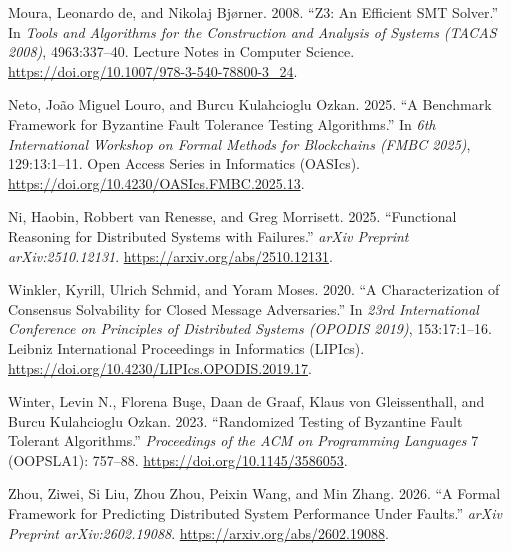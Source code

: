 \documentclass[10pt,a4paper]{article}
\newlength{\cslhangindent}
\newenvironment{CSLReferences}[2]
 {\begin{list}{}{%
  \setlength{\itemindent}{0pt}
  \setlength{\leftmargin}{0pt}
  \setlength{\parsep}{0pt}
  \ifodd #1
   \setlength{\leftmargin}{\cslhangindent}
   \setlength{\itemindent}{-1\cslhangindent}
  \fi
  \setlength{\itemsep}{#2\baselineskip}}}
 {\end{list}}
\begin{document}
\begin{CSLReferences}{1}{0}
Moura, Leonardo de, and Nikolaj Bjørner. 2008. {``Z3: An Efficient SMT
Solver.''} In \emph{Tools and Algorithms for the Construction and
Analysis of Systems (TACAS 2008)}, 4963:337--40. Lecture Notes in
Computer Science. \url{https://doi.org/10.1007/978-3-540-78800-3_24}.

Neto, João Miguel Louro, and Burcu Kulahcioglu Ozkan. 2025. {``A
Benchmark Framework for Byzantine Fault Tolerance Testing Algorithms.''}
In \emph{6th International Workshop on Formal Methods for Blockchains
(FMBC 2025)}, 129:13:1--11. Open Access Series in Informatics (OASIcs).
\url{https://doi.org/10.4230/OASIcs.FMBC.2025.13}.

Ni, Haobin, Robbert van Renesse, and Greg Morrisett. 2025. {``Functional
Reasoning for Distributed Systems with Failures.''} \emph{arXiv Preprint
arXiv:2510.12131}. \url{https://arxiv.org/abs/2510.12131}.

Winkler, Kyrill, Ulrich Schmid, and Yoram Moses. 2020. {``A
Characterization of Consensus Solvability for Closed Message
Adversaries.''} In \emph{23rd International Conference on Principles of
Distributed Systems (OPODIS 2019)}, 153:17:1--16. Leibniz International
Proceedings in Informatics (LIPIcs).
\url{https://doi.org/10.4230/LIPIcs.OPODIS.2019.17}.

Winter, Levin N., Florena Buşe, Daan de Graaf, Klaus von Gleissenthall,
and Burcu Kulahcioglu Ozkan. 2023. {``Randomized Testing of Byzantine
Fault Tolerant Algorithms.''} \emph{Proceedings of the ACM on
Programming Languages} 7 (OOPSLA1): 757--88.
\url{https://doi.org/10.1145/3586053}.

Zhou, Ziwei, Si Liu, Zhou Zhou, Peixin Wang, and Min Zhang. 2026. {``A
Formal Framework for Predicting Distributed System Performance Under
Faults.''} \emph{arXiv Preprint arXiv:2602.19088}.
\url{https://arxiv.org/abs/2602.19088}.

\end{CSLReferences}
\end{document}
